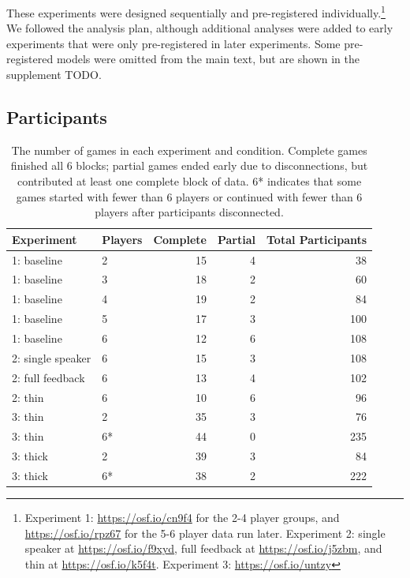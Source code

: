 \documentclass[
  english,
  a4paper,
]{article}
\begin{document}
These experiments were designed sequentially and pre-registered individually.\footnote{Experiment 1: \url{https://osf.io/cn9f4} for the 2-4 player groups, and \url{https://osf.io/rpz67} for the 5-6 player data run later. Experiment 2: single speaker at \url{https://osf.io/f9xyd}, full feedback at \url{https://osf.io/j5zbm}, and thin at \url{https://osf.io/k5f4t}. Experiment 3: \url{https://osf.io/untzy}} We followed the analysis plan, although additional analyses were added to early experiments that were only pre-registered in later experiments. Some pre-registered models were omitted from the main text, but are shown in the supplement TODO.

\hypertarget{participants}{%
\subsection{Participants}\label{participants}}

\begin{table}

\caption{\label{tab:participants}The number of games in each experiment and condition. Complete games finished all 6 blocks; partial games ended early due to disconnections, but contributed at least one complete block of data. 6* indicates that some games started with fewer than 6 players or continued with fewer than 6 players after participants disconnected.}
\centering
\begin{tabular}[t]{l|l|r|r|r}
\hline
Experiment & Players & Complete & Partial & Total Participants\\
\hline
1: baseline & 2 & 15 & 4 & 38\\
\hline
1: baseline & 3 & 18 & 2 & 60\\
\hline
1: baseline & 4 & 19 & 2 & 84\\
\hline
1: baseline & 5 & 17 & 3 & 100\\
\hline
1: baseline & 6 & 12 & 6 & 108\\
\hline
2: single speaker & 6 & 15 & 3 & 108\\
\hline
2: full feedback & 6 & 13 & 4 & 102\\
\hline
2: thin & 6 & 10 & 6 & 96\\
\hline
3: thin & 2 & 35 & 3 & 76\\
\hline
3: thin & 6* & 44 & 0 & 235\\
\hline
3: thick & 2 & 39 & 3 & 84\\
\hline
3: thick & 6* & 38 & 2 & 222\\
\hline
\end{tabular}
\end{table}
\end{document}
